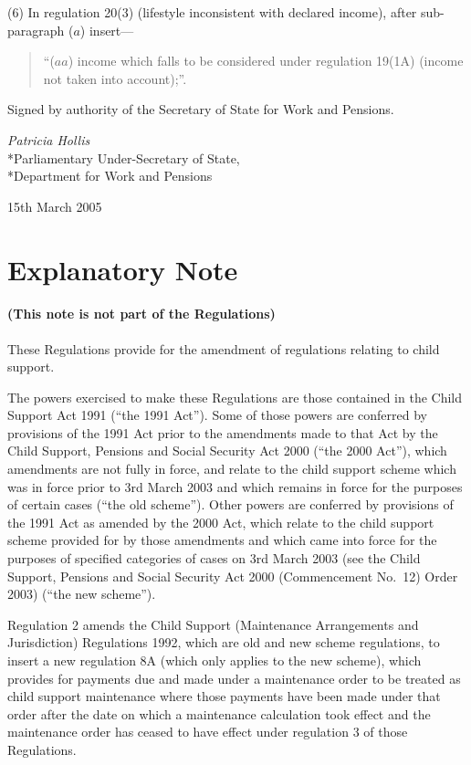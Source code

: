 \documentclass[12pt,a4paper]{article}
\begin{document}
(6) In regulation 20(3) (lifestyle inconsistent with declared income), after sub-paragraph ($a$)  insert—
\begin{quotation}
“($aa$) income which falls to be considered under regulation 19(1A) (income not taken into account);”. 
\end{quotation}

\bigskip

Signed 
by authority of the 
Secretary of State for Work and Pensions.

{\raggedleft
\emph{Patricia Hollis}\\*Parliamentary Under-Secretary of State,\\*Department for Work and Pensions

}

15th March 2005

\small

\part{Explanatory Note}

\renewcommand\parthead{— Explanatory Note}

\subsection*{(This note is not part of the Regulations)}

These Regulations provide for the amendment of regulations relating to child support.

The powers exercised to make these Regulations are those contained in the Child Support Act 1991 (“the 1991 Act”). Some of those powers are conferred by provisions of the 1991 Act prior to the amendments made to that Act by the Child Support, Pensions and Social Security Act 2000 (“the 2000 Act”), which amendments are not fully in force, and relate to the child support scheme which was in force prior to 3rd March 2003 and which remains in force for the purposes of certain cases (“the old scheme”). Other powers are conferred by provisions of the 1991 Act as amended by the 2000 Act, which relate to the child support scheme provided for by those amendments and which came into force for the purposes of specified categories of cases on 3rd March 2003 (see the Child Support, Pensions and Social Security Act 2000 (Commencement No.\ 12) Order 2003) (“the new scheme”).

Regulation 2 amends the Child Support (Maintenance Arrangements and Jurisdiction) Regulations 1992, which are old and new scheme regulations, to insert a new regulation 8A (which only applies to the new scheme), which provides for payments due and made under a maintenance order to be treated as child support maintenance where those payments have been made under that order after the date on which a maintenance calculation took effect and the maintenance order has ceased to have effect under regulation 3 of those Regulations.
\end{document}
